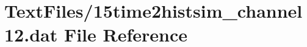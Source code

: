 \hypertarget{15time2histsim__channel12_8dat}{}\section{Text\+Files/15time2histsim\+\_\+channel12.dat File Reference}
\label{15time2histsim__channel12_8dat}
